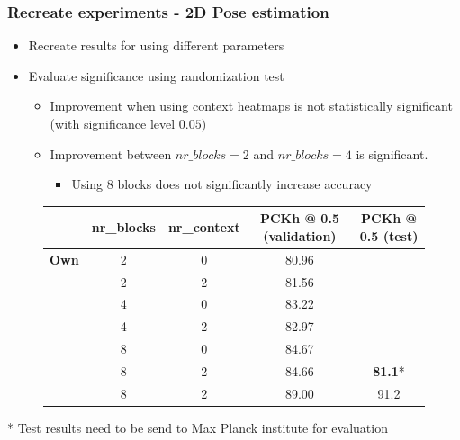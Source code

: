 \documentclass[9pt]{beamer}
\newenvironment{myframe}[1][]{%
\begin{frame}%
\frametitle{#1}
\setcounter{footnote}{0}


}{%
\end{frame}%
}
\begin{document}
\begin{myframe}[Recreate experiments - 2D Pose estimation]
    \begin{itemize}
        \item Recreate results for using different parameters
        \item Evaluate significance using randomization test
        \begin{itemize}
            \item Improvement when using context heatmaps is not statistically significant (with significance level $0.05$)
            \item Improvement between $nr\_blocks = 2$ and $nr\_blocks = 4$ is significant.
            \begin{itemize}
                \item Using $8$ blocks does not significantly increase accuracy
            \end{itemize}
        \end{itemize}
    \end{itemize}
    \begin{figure}
        \begin{table}[]
            \small
            \begin{tabular}{|l|c|c|c|c|}
            \hline
             & \textbf{nr\_blocks} & \textbf{nr\_context} & \textbf{PCKh @ 0.5 (validation)} & \textbf{PCKh @ 0.5 (test)} \\ \hline
            \textbf{Own} & 2 & 0 & 80.96 &  \\
            \textbf{} & 2 & 2 & 81.56 &  \\
            \textbf{} & 4 & 0 & 83.22 &  \\
            \textbf{} & 4 & 2 & 82.97 &  \\
            \textbf{} & 8 & 0 & 84.67 &  \\
            \textbf{} & 8 & 2 & 84.66 & \textbf{81.1}* \\ \hline
            \textbf{\footnotemark} & 8 & 2 & 89.00 & 91.2 \\ \hline
            \end{tabular}
        \end{table}
    \end{figure}
    * Test results need to be send to Max Planck institute for evaluation
\end{myframe}
\end{document}
